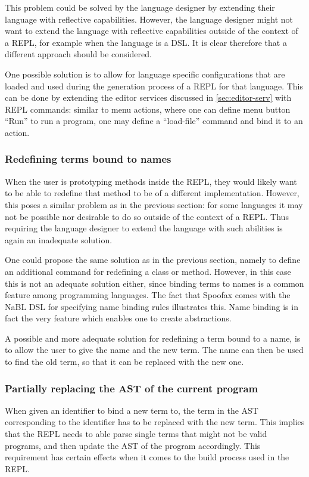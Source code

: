 This problem could be solved by the language designer by extending
their language with reflective capabilities. However, the language
designer might not want to extend the language with reflective
capabilities outside of the context of a REPL, for example when the
language is a DSL. It is clear therefore that a different approach
should be considered.

One possible solution is to allow for language specific configurations
that are loaded and used during the generation process of a REPL for
that language. This can be done by extending the editor services
discussed in \cref{sec:editor-serv} with REPL commands: similar to
menu actions, where one can define menu button ``Run'' to run a
program, one may define a ``load-file'' command and bind it to an
action.

\subsubsection{Redefining terms bound to names}
\label{sec:redef-cont-bound}
When the user is prototyping methods inside the REPL, they would
likely want to be able to redefine that method to be of a different
implementation. However, this poses a similar problem as in the
previous section: for some languages it may not be possible nor
desirable to do so outside of the context of a REPL. Thus requiring
the language designer to extend the language with such abilities is
again an inadequate solution.

One could propose the same solution as in the previous section, namely
to define an additional command for redefining a class or
method. However, in this case this is not an adequate solution either,
since binding terms to names is a common feature among programming
languages. The fact that Spoofax comes with the NaBL DSL for
specifying name binding rules illustrates this. Name binding is in
fact the very feature which enables one to create abstractions.

A possible and more adequate solution for redefining a term bound to a
name, is to allow the user to give the name and the new term. The name
can then be used to find the old term, so that it can be replaced with
the new one.

\subsubsection{Partially replacing the AST of the current program}
When given an identifier to bind a new term to, the term in the AST
corresponding to the identifier has to be replaced with the new term.
This implies that the REPL needs to able parse single terms that might
not be valid programs, and then update the AST of the program accordingly.
This requirement has certain effects when it comes to the build process
used in the REPL.

